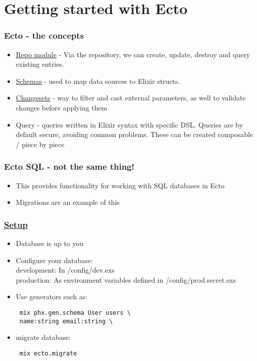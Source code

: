 \section{Getting started with Ecto}

\frame{\tableofcontents[currentsection]}

\begin{frame}
    \frametitle{Ecto - the concepts}

    \begin{itemize}
        \item \href{https://hexdocs.pm/phoenix/ecto.html\#repo-configuration}{Repo module} - Via the repository, we can create, update, destroy and query existing entries.
        \item \href{https://hexdocs.pm/phoenix/ecto.html\#the-schema}{Schemas} - used  to map data sources to Elixir structs.
        \item \href{https://hexdocs.pm/phoenix/ecto.html\#changesets-and-validations}{Changesets} - way to filter and cast external parameters, as well to validate changes before applying them
        \item Query - queries written in Elixir syntax with specific DSL. Queries are by default secure, avoiding common problems. These can be created composable / piece by piece
    \end{itemize}
\end{frame}

\begin{frame}
    \frametitle{Ecto SQL - not the same thing!}

    \begin{itemize}
        \item This provides functionality for working with SQL databases in Ecto
        \item Migrations are an example of this
    \end{itemize}
\end{frame}

\begin{frame}[fragile]
    \frametitle{\href{https://hexdocs.pm/phoenix/ecto.html\#content}{Setup}}

    \begin{itemize}
        \item Database is up to you
        \item Configure your database: \\
         development: In /config/dev.exs \\
         production: As environment variables defined in /config/prod.secret.exs
        \item Use generators such as:
        \begin{verbatim} mix phx.gen.schema User users \ 
 name:string email:string \
        \end{verbatim}
        \item migrate database:
        \begin{verbatim} mix ecto.migrate \end{verbatim}
    \end{itemize}
\end{frame}